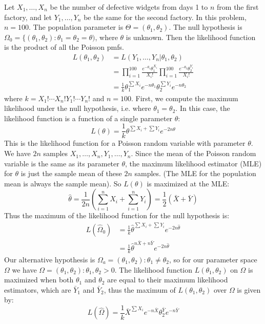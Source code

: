 \documentclass[notes.tex]{subfiles}
\begin{document}
\begin{example}
Let $X_1, \dots, X_n$ be the number of defective widgets from days 1 to $n$ from the first factory, and let $Y_1, \dots, Y_n$ be the same for the second factory. In this problem, $n = 100$. The population parameter is $\Theta = (\theta_1, \theta_2)$. The null hypothesis is $\Omega_0 = \{(\theta_1, \theta_2) : \theta_1 = \theta_2 = \theta)$, where $\theta$ is unknown. Then the likelihood function is the product of all the Poisson pmfs.
\begin{align*}
L(\theta_1, \theta_2) &= L(Y_1, \dots, Y_n|\theta_1, \theta_2)\\
&= \prod_{i=1}^{100} \frac{ e^{-\theta_1} \theta_1^{X_i}}{X_i!}\prod_{i=1}^{100} \frac{ e^{-\theta_2} \theta_2^{Y_i}}{X_i!}\\
&= \frac{1}{k} \theta_1^{\sum X_i} e^{-n \theta_1} \theta_2^{\sum Y_i} e^{-n \theta_2}
\end{align*}
where $k = X_1! \cdots X_n! Y_1! \cdots Y_n!$ and $n = 100$. First, we compute the maximum likelihood under the null hypothesis, i.e. where $\theta_1 = \theta_2$. In this case, the likelihood function is a function of a single parameter $\theta$:
\[
L(\theta) = \frac{1}{k} \theta^{\sum X_i + \sum Y_i} e^{-2 n \theta}
\]
This is the likelihood function for a Poisson random variable with parameter $\theta$. We have $2n$ samples $X_1, \dots, X_n, Y_1, \dots, Y_n$. Since the mean of the Poisson random variable is the same as its parameter $\theta$, the maximum likelihood estimator (MLE) for $\theta$ is just the sample mean of these $2n$ samples. (The MLE for the population mean is always the sample mean). So $L(\theta)$ is maximized at the MLE:
\[
\hat{\theta} = \frac{1}{2n}\left( \sum_{i=1}^{n} X_i + \sum_{i=1}^{n} Y_i \right) = \frac{1}{2}(\bar{X} + \bar{Y})
\]
Thus the maximum of the likelihood function for the null hypothesis is:
\begin{align*}
L(\hat{\Omega}_0) &= \frac{1}{k} \hat{\theta}^{\sum X_i + \sum Y_i} e^{-2 n \hat{\theta}} \\
&= \frac{1}{k} \hat{\theta}^{n\bar{X} + n\bar{Y}} e^{-2 n \hat{\theta}}
\end{align*}
Our alternative hypothesis is $\Omega_a = (\theta_1, \theta_2) : \theta_1 \neq \theta_2$, so for our parameter space $\Omega$ we have $\Omega = (\theta_1, \theta_2) : \theta_1, \theta_2 > 0$. The likelihood function $L(\theta_1, \theta_2)$ on $\Omega$ is maximized when both $\theta_1$ and $\theta_2$ are equal to their maximum likelihood estimators, which are $\bar{Y}_1$ and $\bar{Y}_2$, thus the maximum of $L(\theta_1, \theta_2)$ over $\Omega$ is given by:
\[
L(\hat{\Omega}) = \frac{1}{k} \bar{X}^{\sum X_i} e^{-n \bar{X}} \theta_2^{\bar{Y}} e^{-n \bar{Y}}
\]
\end{example}
\end{document}
